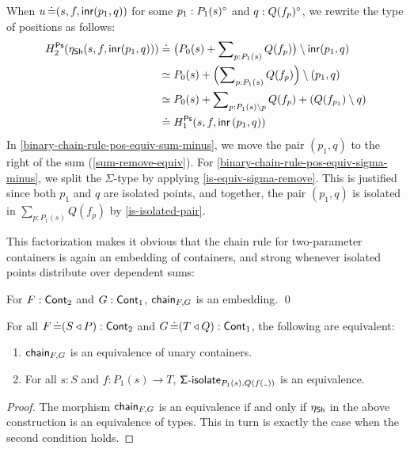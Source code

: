 \begin{problem}[note={Lax chain rule for two-parameter containers}]
\begin{construction}
    When \( u \operatorname{\mathrel{\doteq}} (s, f, \operatorname{\mathsf{inr}}(p_1, q)) \) for some \( p_1 : P_1(s)^{\circ} \) and \( q : Q(f_p)^{\circ} \),
    we rewrite the type of positions as follows:
    \begin{align}
      H_2^{\operatorname{\mathsf{Ps}}}(\eta_{\operatorname{\mathsf{Sh}}}(s , f , \operatorname{\mathsf{inr}}(p_1, q)))
        &\mathrel{\operatorname{\mathrel{\doteq}}}
          \bigl( P_0(s) + \sum\nolimits_{p : P_1(s)} Q(f_p) \bigr) \setminus \operatorname{\mathsf{inr}}(p_1, q)
          \notag
          \\
        &\simeq
          P_0(s) + \Bigl( \sum\nolimits_{p : P_1(s)} Q(f_p) \Bigr) \setminus (p_1, q)
          \label{binary-chain-rule-pos-equiv-sum-minus}
          \\
        &\simeq
          P_0(s) + \sum\nolimits_{p : P_1(s) \setminus p} Q(f_p) + (Q(f_{p_1}) \setminus q)
          \label{binary-chain-rule-pos-equiv-sigma-minus}
          \\
        &\mathrel{\operatorname{\mathrel{\doteq}}}
          H_1^{\operatorname{\mathsf{Ps}}}(s, f, \operatorname{\mathsf{inr}}{(p_1, q)})
          \notag
    \end{align}
    In \eqref{binary-chain-rule-pos-equiv-sum-minus}, we move the pair \( (p_1, q) \) to the right of the sum (\autoref{sum-remove-equiv}).
    For \eqref{binary-chain-rule-pos-equiv-sigma-minus},
    we split the \( \Sigma \)-type by applying \autoref{is-equiv-sigma-remove}.
    This is justified since both \( p_1 \) and \( q \) are isolated points,
    and together, the pair \( (p_1, q) \) is isolated in \( \sum_{p : P_1(s)} Q(f_p) \) by \autoref{is-isolated-pair}.
  \end{construction}
\end{problem}

This factorization makes it obvious that the chain rule for two-parameter containers is again an embedding of containers,
and strong whenever isolated points distribute over dependent sums:
\begin{proposition}\label{is-embedding-binary-chain-rule}
  For \( F : \operatorname{\mathsf{Cont}}_{2} \) and \( G : \operatorname{\mathsf{Cont}}_{1} \), \( \operatorname{\mathsf{chain}}_{F,G} \) is an embedding. \qed
\end{proposition}
\begin{proposition}\label{strong-binary-chain-rule-iff-is-equiv-sigma-isolate}
  For all \( F \operatorname{\mathrel{\doteq}} (S\mathbin{\triangleleft}P) : \operatorname{\mathsf{Cont}}_{2} \) and \( G \operatorname{\mathrel{\doteq}} (T\mathbin{\triangleleft}Q) : \operatorname{\mathsf{Cont}}_{1} \), the following are equivalent:
  \begin{enumerate}
    \item \( \operatorname{\mathsf{chain}}_{F,G} \) is an equivalence of unary containers.
    \item For all \( s : S \) and \( f : P_1(s) \to T \), \( \SigmaIsolate_{P_1(s), Q(f(\Blank))} \) is an equivalence.
  \end{enumerate}
  \begin{proof}
    The morphism \( \operatorname{\mathsf{chain}}_{F,G} \) is an equivalence if and only if \( \eta_{\operatorname{\mathsf{Sh}}} \) in the above construction is an equivalence of types.
    This in turn is exactly the case when the second condition holds.
  \end{proof}
\end{proposition}

